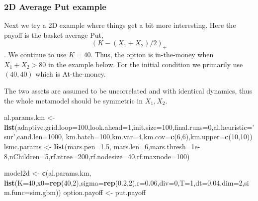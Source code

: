 \documentclass[]{article}
\newenvironment{Shaded}{\begin{snugshade}}{\end{snugshade}}
\newcommand{\KeywordTok}[1]{\textcolor[rgb]{0.13,0.29,0.53}{\textbf{#1}}}
\newcommand{\DataTypeTok}[1]{\textcolor[rgb]{0.13,0.29,0.53}{#1}}
\newcommand{\DecValTok}[1]{\textcolor[rgb]{0.00,0.00,0.81}{#1}}
\newcommand{\FloatTok}[1]{\textcolor[rgb]{0.00,0.00,0.81}{#1}}
\newcommand{\StringTok}[1]{\textcolor[rgb]{0.31,0.60,0.02}{#1}}
\newcommand{\NormalTok}[1]{#1}
\begin{document}
\subsubsection{2D Average Put example}\label{d-average-put-example}

Next we try a 2D example where things get a bit more interesting. Here
the payoff is the basket average Put, \[ (K - (X_1+X_2)/2)_+\]. We
continue to use \(K=40\). Thus, the option is in-the-money when
\(X_1+X_2 > 80\) in the example below. For the initial condition we
primarily use \((40,40)\) which is At-the-money.

The two assets are assumed to be uncorrelated and with identical
dynamics, thus the whole metamodel should be symmetric in \(X_1,X_2\).

\begin{Shaded}
\begin{Highlighting}[]
\NormalTok{al.params.km <-}\StringTok{ }\KeywordTok{list}\NormalTok{(}\DataTypeTok{adaptive.grid.loop=}\DecValTok{100}\NormalTok{,}\DataTypeTok{look.ahead=}\DecValTok{1}\NormalTok{,}\DataTypeTok{init.size=}\DecValTok{100}\NormalTok{,}\DataTypeTok{final.runs=}\DecValTok{0}\NormalTok{,}\DataTypeTok{al.heuristic=}\StringTok{'sur'}\NormalTok{,}\DataTypeTok{cand.len=}\DecValTok{1000}\NormalTok{,}
\DataTypeTok{km.batch=}\DecValTok{100}\NormalTok{,}\DataTypeTok{km.var=}\DecValTok{4}\NormalTok{,}\DataTypeTok{km.cov=}\KeywordTok{c}\NormalTok{(}\DecValTok{6}\NormalTok{,}\DecValTok{6}\NormalTok{),}\DataTypeTok{km.upper=}\KeywordTok{c}\NormalTok{(}\DecValTok{10}\NormalTok{,}\DecValTok{10}\NormalTok{))}
\NormalTok{lsmc.params <-}\StringTok{ }\KeywordTok{list}\NormalTok{(}\DataTypeTok{mars.pen=}\FloatTok{1.5}\NormalTok{, }\DataTypeTok{mars.len=}\DecValTok{6}\NormalTok{,}\DataTypeTok{mars.thresh=}\FloatTok{1e-8}\NormalTok{,}\DataTypeTok{nChildren=}\DecValTok{5}\NormalTok{,}\DataTypeTok{rf.ntree=}\DecValTok{200}\NormalTok{,}\DataTypeTok{rf.nodesize=}\DecValTok{40}\NormalTok{,}\DataTypeTok{rf.maxnode=}\DecValTok{100}\NormalTok{)}

\NormalTok{model2d <-}\StringTok{ }\KeywordTok{c}\NormalTok{(al.params.km,        }
             \KeywordTok{list}\NormalTok{(}\DataTypeTok{K=}\DecValTok{40}\NormalTok{,}\DataTypeTok{x0=}\KeywordTok{rep}\NormalTok{(}\DecValTok{40}\NormalTok{,}\DecValTok{2}\NormalTok{),}\DataTypeTok{sigma=}\KeywordTok{rep}\NormalTok{(}\FloatTok{0.2}\NormalTok{,}\DecValTok{2}\NormalTok{),}\DataTypeTok{r=}\FloatTok{0.06}\NormalTok{,}\DataTypeTok{div=}\DecValTok{0}\NormalTok{,}\DataTypeTok{T=}\DecValTok{1}\NormalTok{,}\DataTypeTok{dt=}\FloatTok{0.04}\NormalTok{,}\DataTypeTok{dim=}\DecValTok{2}\NormalTok{,}\DataTypeTok{sim.func=}\NormalTok{sim.gbm))}
\NormalTok{option.payoff <-}\StringTok{ }\NormalTok{put.payoff}
\end{Highlighting}
\end{Shaded}
\end{document}
